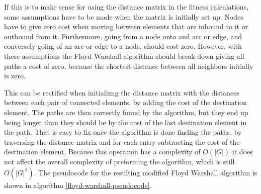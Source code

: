 If this is to make sense for using the distance matrix in the fitness calculations, some assumptions have to be made when the matrix is initially set up. Nodes have to give zero cost when moving between elements that are inbound to it or outbound from it. Furthermore, going from a node onto and arc or edge, and conversely going of an arc or edge to a node, should cost zero. However, with these assumptions the Floyd Warshall algorithm should break down giving all paths a cost of zero, because the shortest distance between all neighbors initially is zero.

This can be rectified when initializng the distance matrix with the distances between each pair of connected elements, by adding the cost of the destination element. The paths are then correctly found by the algorithm, but they end up being longer than they should be by the cost of the last destination element in the path. That is easy to fix once the algorithm is done finding the paths, by traversing the distance matrix and for each entry subtracting the cost of the destination element. Because this operation has a complexity of $O(|G|)$ it does not affect the overall complexity of preforming the algorithm, which is still $O(|G|^3)$. The pseudocode for the resulting modified Floyd Warshall algorithm is shown in algorithm \ref{floyd-warshall-pseudocode}.


